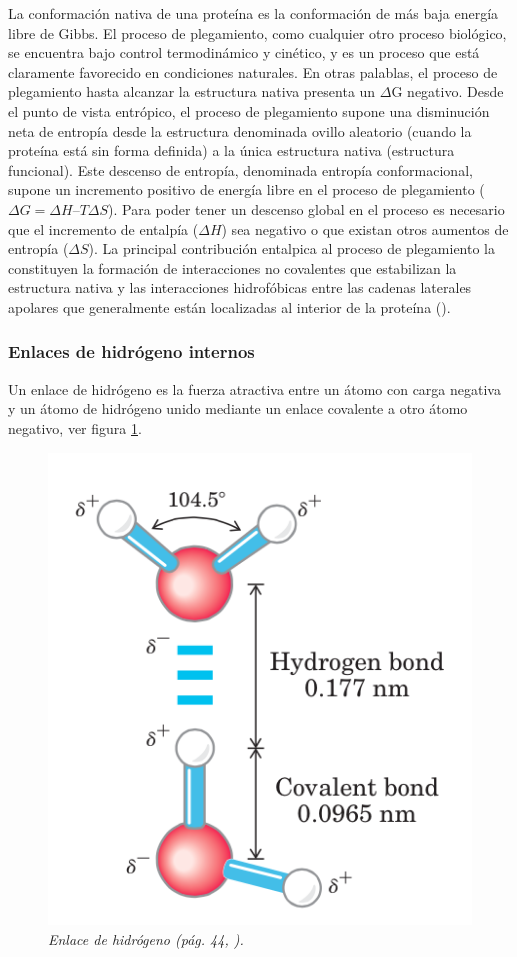 La conformación nativa de una proteína es la conformación de más baja energía libre de Gibbs. El proceso de plegamiento, como cualquier otro proceso biológico, se encuentra bajo control termodinámico y cinético, y es un proceso que está claramente favorecido en condiciones naturales. En otras palablas, el proceso de plegamiento hasta alcanzar la estructura nativa presenta un $\Delta$G negativo. Desde el punto de vista entrópico, el proceso de plegamiento supone una disminución neta de entropía desde la estructura denominada ovillo aleatorio (cuando la proteína está sin forma definida) a la única estructura nativa (estructura funcional). Este descenso de entropía, denominada entropía conformacional, supone un incremento positivo de energía libre en el proceso de plegamiento ($\Delta G = \Delta H – T\Delta S$). Para poder tener un descenso global en el proceso es necesario que el incremento de entalpía ($\Delta H$) sea negativo o que existan otros aumentos de entropía ($\Delta S$). La principal contribución entalpica al proceso de plegamiento la constituyen la formación de interacciones no covalentes que estabilizan la estructura nativa y las interacciones hidrofóbicas entre las cadenas laterales apolares que generalmente están localizadas al interior de la proteína (\citealp{entropia}).

\subsubsection{Enlaces de hidrógeno internos}

Un enlace de hidrógeno es la fuerza atractiva entre un átomo con carga negativa y un átomo de hidrógeno unido mediante un enlace covalente a otro átomo negativo, ver figura \ref{fig:h-bond}. 
\begin{figure}[h]
	\centering
	\includegraphics[scale=.5]{images/hidrobond.png}
	\caption{\em Enlace de hidrógeno (pág. 44, \citealp{lehninger}).}
	\label{fig:h-bond}
\end{figure}


